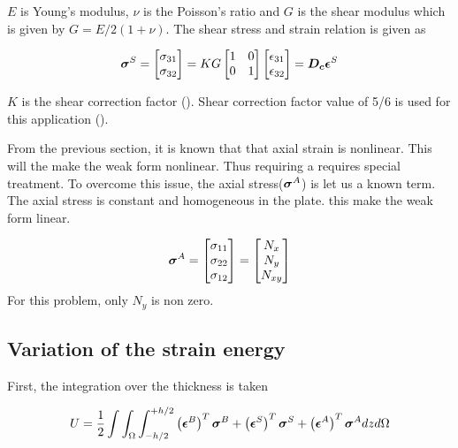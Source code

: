 \documentclass[main.tex]{subfiles}
\begin{document}
$E$ is Young's modulus, $\nu$ is the Poisson's ratio and $G$ is the shear modulus which is given by $G=E / 2 ( 1+\nu ) $. The shear stress and strain relation is given as

\begin{equation}
\boldsymbol{\sigma}^S = \begin{bmatrix}
\sigma_{31}
\\
 \sigma_{32}
\end{bmatrix}
=KG
\begin{bmatrix}
1 & 0 
\\
0 & 1 
\end{bmatrix}
\begin{bmatrix}
\epsilon_{31}
\\
\epsilon_{32}
\end{bmatrix}
=
\boldsymbol{D_c} \boldsymbol{\epsilon}^S
\end{equation}

$K$ is the shear correction factor (\cite{StatAndDynaforshearcorrect}). Shear correction factor value of 5/6 is used for this application (\cite{WANG1999467}).

From the previous section, it is known that that axial strain is nonlinear. This will the make the weak form nonlinear. Thus requiring a requires special treatment. To overcome this issue, the axial stress($\boldsymbol{\sigma}^A$) is let us a known term. The axial stress is constant and homogeneous in the plate. this make the weak form linear.

\begin{equation}
\boldsymbol{\sigma}^A = \begin{bmatrix}
\sigma_{11}
\\
\sigma_{22}
\\
\sigma_{12}
\end{bmatrix}
=
\begin{bmatrix}
N_x
\\
N_y
\\
N_{xy}
\end{bmatrix}
\end{equation}
For this problem, only $N_y$ is non zero. 


\subsection{Variation of the strain energy}

First, the integration over the thickness is taken  

\begin{equation}
U=\frac{1}{2} \int\int_\Omega \int_{-h/2}^{+h/2} \left(\boldsymbol{\epsilon}^B\right)^T \boldsymbol{\sigma}^B + \left(\boldsymbol{\epsilon}^S\right)^T \boldsymbol{\sigma}^S + \left(\boldsymbol{\epsilon}^A\right)^T \boldsymbol{\sigma}^A dz d \Omega
\end{equation}
\end{document}
